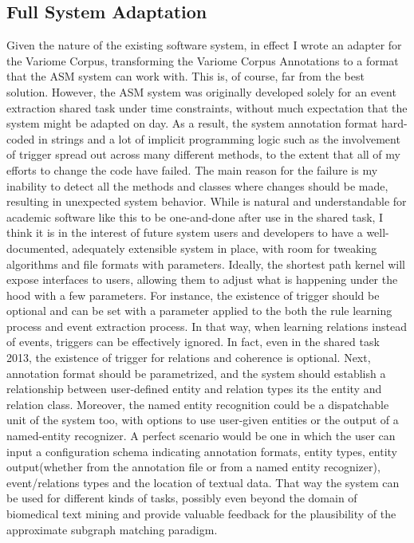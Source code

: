 \subsection{Full System Adaptation}
Given the nature of the existing software system, in effect I wrote an adapter for the Variome Corpus, transforming the Variome Corpus Annotations to a format that the ASM system can work with. This is, of course, far from the best solution. However, the ASM system was originally developed solely for an event extraction shared task under time constraints, without much expectation that the system might be adapted on day. As a result, the system annotation format hard-coded in strings and a lot of implicit programming logic such as the involvement of trigger spread out across many different methods, to the extent that all of my efforts to change the code have failed. The main reason for the failure is my inability to detect all the methods and classes where changes should be made, resulting in unexpected system behavior. While is natural and understandable for academic software like this to be one-and-done after use in the shared task, I think it is in the interest of future system users and developers to have a well-documented, adequately extensible system in place, with room for tweaking algorithms and file formats with parameters. Ideally, the shortest path kernel will expose interfaces to users, allowing them to adjust what is happening under the hood with a few parameters. For instance, the existence of trigger should be optional and can be set with a parameter applied to the both the rule learning process and event extraction process. In that way, when learning relations instead of events, triggers can be effectively ignored. In fact, even in the shared task 2013, the existence of trigger for relations and coherence is optional. Next, annotation format should be parametrized, and the system should establish a relationship between user-defined entity and relation types its the entity and relation class. Moreover, the named entity recognition could be a dispatchable unit of the system too, with options to use user-given entities or the output of a named-entity recognizer. A perfect scenario would be one in which the user can input a configuration schema indicating annotation formats, entity types, entity output(whether from the annotation file or from a named entity recognizer), event/relations types and the location of textual data. That way the system can be used for different kinds of tasks, possibly even beyond the domain of biomedical text mining and provide valuable feedback for the plausibility of the approximate subgraph matching paradigm.   
